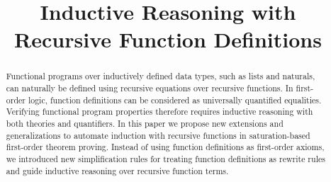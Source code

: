 \documentclass[conference]{IEEEtran}
\begin{document}
	\title{Inductive Reasoning with Recursive Function Definitions}


	\author{
	}

	\maketitle

	\begin{abstract}
Functional programs over inductively defined data types, such as lists and naturals,
can naturally be defined using recursive equations over recursive functions. 
In first-order logic,  function
definitions can be considered as universally quantified equalities. 
Verifying functional program properties therefore 
 requires inductive 
reasoning with both theories and quantifiers. 
In this paper we propose new  extensions and
generalizations to automate induction with recursive functions in saturation-based first-order theorem proving.
Instead of using function definitions as first-order axioms, we introduced new simplification rules for
treating function definitions as rewrite rules and guide inductive reasoning over recursive function terms.
	\end{abstract}
	
	
	
	
	
	\IEEEpeerreviewmaketitle
	
\end{document}
